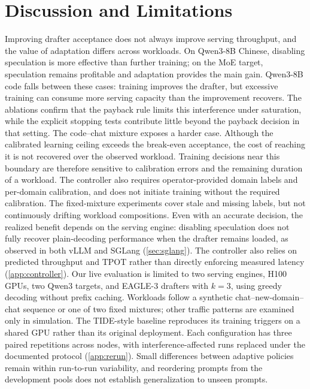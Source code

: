 
\section{Discussion and Limitations}\label{sec:limitations}

Improving drafter acceptance does not always improve serving throughput, and the value of adaptation differs across workloads. On Qwen3-8B Chinese, disabling speculation is more effective than further training; on the MoE target, speculation remains profitable and adaptation provides the main gain. Qwen3-8B code falls between these cases: training improves the drafter, but excessive training can consume more serving capacity than the improvement recovers. The ablations confirm that the payback rule limits this interference under saturation, while the explicit stopping tests contribute little beyond the payback decision in that setting. The code--chat mixture exposes a harder case. Although the calibrated learning ceiling exceeds the break-even acceptance, the cost of reaching it is not recovered over the observed workload. Training decisions near this boundary are therefore sensitive to calibration errors and the remaining duration of a workload. The controller also requires operator-provided domain labels and per-domain calibration, and does not initiate training without the required calibration. The fixed-mixture experiments cover stale and missing labels, but not continuously drifting workload compositions. Even with an accurate decision, the realized benefit depends on the serving engine: disabling speculation does not fully recover plain-decoding performance when the drafter remains loaded, as observed in both vLLM and SGLang (\cref{sec:sglang}). The controller also relies on predicted throughput and TPOT rather than directly enforcing measured latency (\cref{app:controller}). Our live evaluation is limited to two serving engines, H100 GPUs, two Qwen3 targets, and EAGLE-3 drafters with $k{=}3$, using greedy decoding without prefix caching. Workloads follow a synthetic chat--new-domain--chat sequence or one of two fixed mixtures; other traffic patterns are examined only in simulation. The TIDE-style baseline reproduces its training triggers on a shared GPU rather than its original deployment. Each configuration has three paired repetitions across  nodes, with interference-affected runs replaced under the documented protocol (\cref{app:rerun}). Small differences between adaptive policies remain within run-to-run variability, and reordering prompts from the development pools does not establish generalization to unseen prompts.
